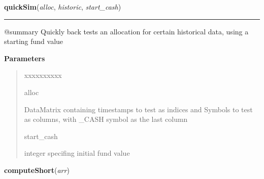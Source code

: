 \hspace{.8\funcindent}\begin{boxedminipage}{\funcwidth}

    \raggedright \textbf{quickSim}(\textit{alloc}, \textit{historic}, \textit{start\_cash})

    \vspace{-1.5ex}

    \rule{\textwidth}{0.5\fboxrule}
\setlength{\parskip}{2ex}
    @summary Quickly back tests an allocation for certain historical data, 
    using a starting fund value

\setlength{\parskip}{1ex}
      \textbf{Parameters}
      \vspace{-1ex}

      \begin{quote}
        \begin{Ventry}{xxxxxxxxxx}

          \item[alloc]

          DataMatrix containing timestamps to test as indices and Symbols 
          to test as columns, with \_CASH symbol as the last column

          \item[start\_cash]

          integer specifing initial fund value

        \end{Ventry}

      \end{quote}

    \end{boxedminipage}

    \label{QSTK:quicksim:quickSim:computeShort}

    \vspace{0.5ex}

\hspace{.8\funcindent}\begin{boxedminipage}{\funcwidth}

    \raggedright \textbf{computeShort}(\textit{arr})

\setlength{\parskip}{2ex}
\setlength{\parskip}{1ex}
    \end{boxedminipage}

    \label{QSTK:quicksim:quickSim:computeLong}

